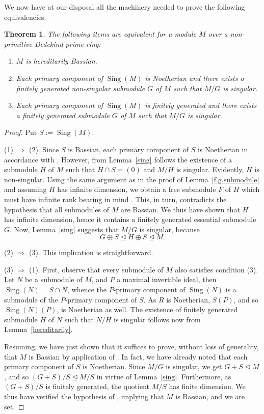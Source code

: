 \documentclass{amsart}
\newtheorem{thm}{Theorem}[section]
\theoremstyle{definition}
\DeclareMathOperator{\Sing}{{Sing}}
\begin{document}
We now have at our disposal all the machinery needed to prove the following equivalencies.

\begin{thm}\label{hereditarily Bassian}
The following items are equivalent for a module $M$ over a non-primitive Dedekind prime ring:
\begin{enumerate}
\item[(1)] $M$ is hereditarily Bassian.
\item[(2)] Each primary component of $\Sing(M)$ is Noetherian and there exists a finitely generated non-singular submodule $G$ of $M$ such that $M/G$ is singular.
\item[(3)] Each primary component of $\Sing(M)$ is finitely generated and there exists a finitely generated submodule $G$ of $M$ such that $M/G$ is singular.
\end{enumerate}
\end{thm}

\begin{proof} Put $S:=\Sing(M)$.

(1) $\Rightarrow$ (2). Since $S$ is Bassian, each primary component of $S$ is Noetherian in accordance with \cite[Theorem 1]{T}. However, from Lemma~\ref{sing} follows the existence of a submodule $H$ of $M$ such that $H\cap S=(0)$ and $M/H$ is singular. Evidently, $H$ is non-singular. Using the same argument as in the proof of Lemma~\ref{f.g.submodule} and assuming $H$ has infinite dimension, we obtain a free submodule $F$ of $H$ which must have infinite rank bearing in mind \cite[Lemma 4.3]{T}. This, in turn, contradicts the hypothesis that all submodules of $M$ are Bassian. We thus have shown that $H$ has infinite dimension, hence it contains a finitely generated essential submodule $G$. Now, Lemma~\ref{sing} suggests that $M/G$ is singular, because $$G\oplus S \trianglelefteq H\oplus S \trianglelefteq M.$$

(2) $\Rightarrow$ (3). This implication is straightforward.

(3) $\Rightarrow$ (1). First, observe that every submodule of $M$ also satisfies condition (3). Let $N$ be a submodule of $M$, and $P$ a maximal invertible ideal, then $\Sing(N)=S\cap N$, whence the $P$-primary component of $\Sing(N)$ is a submodule of the $P$-primary component of $S$. As $R$ is Noetherian, $S(P)$, and so $\Sing(N)(P)$, is Noetherian as well. The existence of finitely generated submodule $H$ of $N$ such that $N/H$ is singular follows now from Lemma~\ref{hereditarily}.

Resuming, we have just shown that it suffices to prove, without loss of generality, that $M$ is Bassian by application of \cite[Theorem 3]{T}. In fact, we have already noted that each primary component of $S$ is Noetherian. Since $M/G$ is singular, we get $G+S\trianglelefteq M$, and so $(G+S)/S\trianglelefteq M/S$ in virtue of Lemma~\ref{sing}. Furthermore, as $(G+S)/S$ is finitely generated, the quotient $M/S$ has finite dimension. We thus have verified the hypothesis of \cite[Theorem 3]{T}, implying that $M$ is Bassian, and we are set.
\end{proof}
\end{document}
